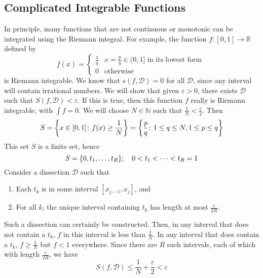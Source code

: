 \subsection{Complicated Integrable Functions}
In principle, many functions that are not continuous or monotonic can be integrated using the Riemann integral. For example, the function $f\colon [0, 1] \to \mathbb R$ defined by
\[ f(x) = \begin{cases}
		\frac{1}{q} & x = \frac{p}{q} \in (0, 1] \text{ in its lowest form } \\
		0           & \text{otherwise}
	\end{cases} \]
is Riemann integrable. We know that $s(f, \mathcal D) = 0$ for all $\mathcal D$, since any interval will contain irrational numbers. We will show that given $\varepsilon > 0$, there exists $\mathcal D$ such that $S(f, \mathcal D) < \varepsilon$. If this is true, then this function $f$ really is Riemann integrable, with $\int f = 0$. We will choose $N \in \mathbb N$ such that $\frac{1}{N} < \frac{\varepsilon}{2}$. Then
\[ S = \qty{ x \in [0, 1] \colon f(x) \geq \frac{1}{N} } = \qty{ \frac{p}{q} \colon 1 \leq q \leq N, 1 \leq p \leq q } \]
This set $S$ is a finite set, hence
\[ S = \qty{ 0, t_1, \dots, t_R };\quad 0 < t_1 < \dots < t_R = 1 \]
Consider a dissection $\mathcal D$ such that
\begin{enumerate}[(1)]
	\item Each $t_k$ is in some interval $[x_{j-1}, x_j]$, and
	\item For all $k$, the unique interval containing $t_k$ has length at most $\frac{\varepsilon}{2R}$.
\end{enumerate}
Such a dissection can certainly be constructed. Then, in any interval that does not contain a $t_k$, $f$ in this interval is less than $\frac{1}{N}$. In any interval that does contain a $t_k$, $f \geq \frac{1}{N}$ but $f < 1$ everywhere. Since there are $R$ such intervals, each of which with length $\frac{\varepsilon}{2R}$, we have
\[ S(f, \mathcal D) \leq \frac{1}{N} + \frac{\varepsilon}{2} < \varepsilon \]

